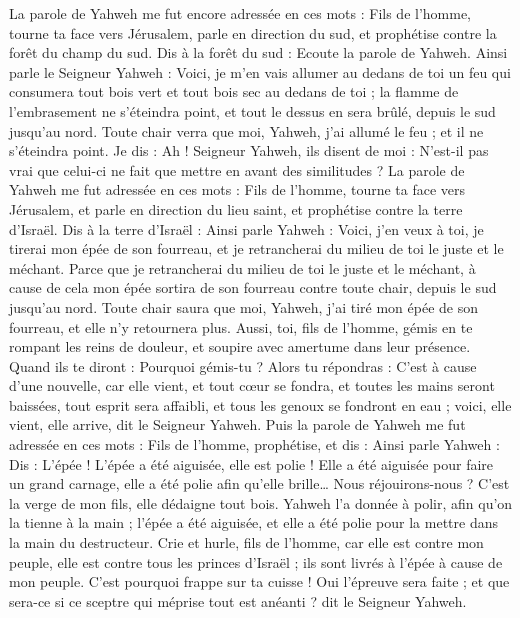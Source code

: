 \begin{multicols}{2}
\VerseOne{}La parole de Yahweh me fut encore adressée en ces mots :
Fils de l’homme, tourne ta face vers Jérusalem, parle en direction du sud, et prophétise contre la forêt du champ du sud.
Dis à la forêt du sud : Ecoute la parole de Yahweh. Ainsi parle le Seigneur Yahweh : Voici, je m'en vais allumer au dedans de toi un feu qui consumera tout bois vert et tout bois sec au dedans de toi ; la flamme de l'embrasement ne s'éteindra point, et tout le dessus en sera brûlé, depuis le sud jusqu'au nord\FTNT{}.
Toute chair verra que moi, Yahweh, j'ai allumé le feu ; et il ne s'éteindra point.
Je dis : Ah ! Seigneur Yahweh, ils disent de moi : N'est-il pas vrai que celui-ci ne fait que mettre en avant des similitudes ?
La parole de Yahweh me fut adressée en ces mots :
Fils de l’homme, tourne ta face vers Jérusalem, et parle en direction du lieu saint, et prophétise contre la terre d'Israël.
Dis à la terre d'Israël : Ainsi parle Yahweh : Voici, j'en veux à toi, je tirerai mon épée de son fourreau, et je retrancherai du milieu de toi le juste et le méchant.
Parce que je retrancherai du milieu de toi le juste et le méchant, à cause de cela mon épée sortira de son fourreau contre toute chair, depuis le sud jusqu'au nord.
Toute chair saura que moi, Yahweh, j'ai tiré mon épée de son fourreau, et elle n'y retournera plus.
Aussi, toi, fils de l’homme, gémis en te rompant les reins de douleur, et soupire avec amertume dans leur présence.
Quand ils te diront : Pourquoi gémis-tu ? Alors tu répondras : C'est à cause d’une nouvelle, car elle vient, et tout cœur se fondra, et toutes les mains seront baissées, tout esprit sera affaibli, et tous les genoux se fondront en eau ; voici, elle vient, elle arrive, dit le Seigneur Yahweh\FTNT{}.
Puis la parole de Yahweh me fut adressée en ces mots :
Fils de l’homme, prophétise, et dis : Ainsi parle Yahweh : Dis : L'épée ! L'épée a été aiguisée, elle est polie !
Elle a été aiguisée pour faire un grand carnage, elle a été polie afin qu'elle brille… Nous réjouirons-nous ? C'est la verge de mon fils, elle dédaigne tout bois.
Yahweh l'a donnée à polir, afin qu'on la tienne à la main ; l'épée a été aiguisée, et elle a été polie pour la mettre dans la main du destructeur.
Crie et hurle, fils de l’homme, car elle est contre mon peuple, elle est contre tous les princes d'Israël ; ils sont livrés à l'épée à cause de mon peuple. C'est pourquoi frappe sur ta cuisse !
Oui l’épreuve sera faite ; et que sera-ce si ce sceptre qui méprise tout est anéanti ? dit le Seigneur Yahweh.

\end{multicols}

